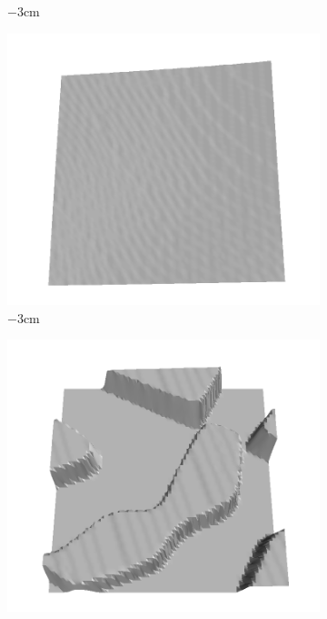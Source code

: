 \documentclass[../document.tex]{subfiles}
\begin{document}
\begin{figure}[htbp]
\begin{subfigure}[b]{0.19\textwidth}
    \caption{$-3$cm}
    \end{subfigure}
    \begin{subfigure}[b]{0.19\textwidth}
    \includegraphics[width=\linewidth]{../img/5/train/all/-372-patch-3d-majavi-0.png}
    \caption{$-3$cm}
    \end{subfigure}
    \begin{subfigure}[b]{0.19\textwidth}
    \includegraphics[width=\linewidth]{../img/5/train/all/-6-patch-3d-majavi-1.png}

\end{subfigure}
\end{figure}
\end{document}
